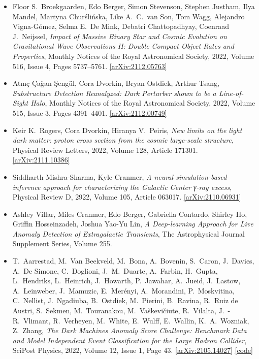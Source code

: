 \begin{itemize}
\item Floor S.\  Broekgaarden, Edo Berger, Simon Stevenson, Stephen Justham, Ilya Mandel, Martyna Churślińska, Like A.\  C.\  van Son, Tom Wagg, Alejandro Vigna-Gómez, Selma E.\  De Mink, Debatri Chattopadhyay, Coenraad J.\  Neijssel, \textit{Impact of Massive Binary Star and Cosmic Evolution on Gravitational Wave Observations II: Double Compact Object Rates and Properties}, Monthly Notices of the Royal Astronomical Society, 2022, Volume 516, Issue 4, Pages 5737–5761. \href{https://arxiv.org/abs/2112.05763}{[arXiv:2112.05763]} 
\item Atınç Çağan Şengül, Cora Dvorkin, Bryan Ostdiek, Arthur Tsang, \textit{Substructure Detection Reanalyzed: Dark Perturber shown to be a Line-of-Sight Halo}, Monthly Notices of the Royal Astronomical Society, 2022, Volume 515, Issue 3, Pages 4391–4401. \href{https://arxiv.org/abs/2112.00749}{[arXiv:2112.00749]} 
\item Keir K.\  Rogers, Cora Dvorkin, Hiranya V.\  Peiris, \textit{New limits on the light dark matter: proton cross section from the cosmic large-scale structure}, Physical Review Letters, 2022, Volume 128, Article 171301. \href{https://arxiv.org/abs/2111.10386}{[arXiv:2111.10386]} 
\item Siddharth Mishra-Sharma, Kyle Cranmer, \textit{A neural simulation-based inference approach for characterizing the Galactic Center γ-ray excess}, Physical Review D, 2922, Volume 105, Article 063017. \href{https://arxiv.org/abs/2110.06931}{[arXiv:2110.06931]} 
\item Ashley Villar, Miles Cranmer, Edo Berger, Gabriella Contardo, Shirley Ho, Griffin Hosseinzadeh, Joshua Yao-Yu Lin, \textit{A Deep-learning Approach for Live Anomaly Detection of Extragalactic Transients}, The Astrophysical Journal Supplement Series, Volume 255. 
\item T.\  Aarrestad, M.\  Van Beekveld, M.\  Bona, A.\  Bovenin, S.\  Caron, J.\  Davies, A.\  De Simone, C.\  Doglioni, J.\ M.\  Duarte, A.\  Farbin, H.\  Gupta, L.\  Hendriks, L.\  Heinrich, J.\  Howarth, P.\  Jawahar, A.\  Jueid, J.\  Lastow, A.\  Leinweber, J.\  Mamuzic, E.\  Merényi, A.\  Morandini, P.\  Moskvitina, C.\  Nellist, J.\  Ngadiuba, B.\  Ostdiek, M.\  Pierini, B.\  Ravina, R.\  Ruiz de Austri, S.\  Sekmen, M.\  Touranakou, M.\  Vaškevičiūte, R.\  Vilalta, J.\ -R.\  Vlimant, R.\  Verheyen, M.\  White, E.\  Wulff, E.\  Wallin, K.\ A.\  Wozniak, Z.\  Zhang, \textit{The Dark Machines Anomaly Score Challenge: Benchmark Data and Model Independent Event Classification for the Large Hadron Collider}, SciPost Physics, 2022, Volume 12, Issue 1, Page 43. \href{https://arxiv.org/abs/2105.14027}{[arXiv:2105.14027]}  \href{https://github.com/bostdiek/DarkMachines-UnsupervisedChallenge}{[code]} 

\end{itemize}
